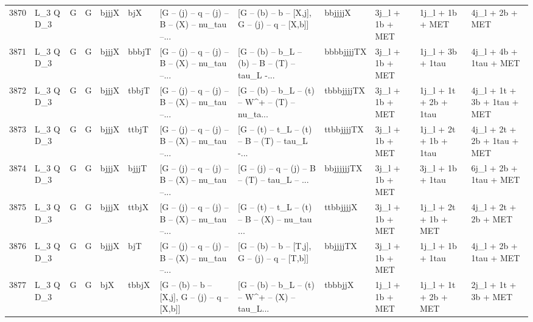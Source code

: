 \begin{tabular}{llllllllllll}
3870 &    L\_3 Q D\_3 &     G &     G &       bjjjX &         bjX &  [G -- (j) -- q -- (j) -- B -- (X) -- nu\_tau --... &   [G -- (b) -- b -- [X,j], G -- (j) -- q -- [X,b]] &     bbjjjjX &          3j\_l + 1b + MET &          1j\_l + 1b + MET &                    4j\_l + 2b + MET \\
3871 &    L\_3 Q D\_3 &     G &     G &       bjjjX &       bbbjT &  [G -- (j) -- q -- (j) -- B -- (X) -- nu\_tau --... &  [G -- (b) -- b\_L -- (b) -- B -- (T) -- tau\_L -... &  bbbbjjjjTX &          3j\_l + 1b + MET &         1j\_l + 3b + 1tau &             4j\_l + 4b + 1tau + MET \\
3872 &    L\_3 Q D\_3 &     G &     G &       bjjjX &       tbbjT &  [G -- (j) -- q -- (j) -- B -- (X) -- nu\_tau --... &  [G -- (b) -- b\_L -- (t) -- W\textasciicircum + -- (T) -- nu\_ta... &  tbbbjjjjTX &          3j\_l + 1b + MET &    1j\_l + 1t + 2b + 1tau &        4j\_l + 1t + 3b + 1tau + MET \\
3873 &    L\_3 Q D\_3 &     G &     G &       bjjjX &       ttbjT &  [G -- (j) -- q -- (j) -- B -- (X) -- nu\_tau --... &  [G -- (t) -- t\_L -- (t) -- B -- (T) -- tau\_L -... &  ttbbjjjjTX &          3j\_l + 1b + MET &    1j\_l + 2t + 1b + 1tau &        4j\_l + 2t + 2b + 1tau + MET \\
3874 &    L\_3 Q D\_3 &     G &     G &       bjjjX &       bjjjT &  [G -- (j) -- q -- (j) -- B -- (X) -- nu\_tau --... &  [G -- (j) -- q -- (j) -- B -- (T) -- tau\_L -- ... &  bbjjjjjjTX &          3j\_l + 1b + MET &         3j\_l + 1b + 1tau &             6j\_l + 2b + 1tau + MET \\
3875 &    L\_3 Q D\_3 &     G &     G &       bjjjX &       ttbjX &  [G -- (j) -- q -- (j) -- B -- (X) -- nu\_tau --... &  [G -- (t) -- t\_L -- (t) -- B -- (X) -- nu\_tau ... &   ttbbjjjjX &          3j\_l + 1b + MET &     1j\_l + 2t + 1b + MET &               4j\_l + 2t + 2b + MET \\
3876 &    L\_3 Q D\_3 &     G &     G &       bjjjX &         bjT &  [G -- (j) -- q -- (j) -- B -- (X) -- nu\_tau --... &   [G -- (b) -- b -- [T,j], G -- (j) -- q -- [T,b]] &    bbjjjjTX &          3j\_l + 1b + MET &         1j\_l + 1b + 1tau &             4j\_l + 2b + 1tau + MET \\
3877 &    L\_3 Q D\_3 &     G &     G &         bjX &       tbbjX &   [G -- (b) -- b -- [X,j], G -- (j) -- q -- [X,b]] &  [G -- (b) -- b\_L -- (t) -- W\textasciicircum + -- (X) -- tau\_L... &     tbbbjjX &          1j\_l + 1b + MET &     1j\_l + 1t + 2b + MET &               2j\_l + 1t + 3b + MET \\

\end{tabular}
